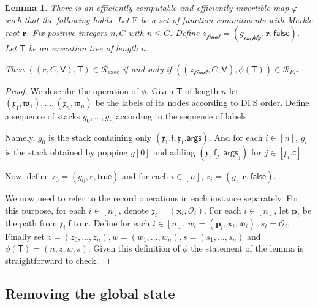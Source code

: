 \documentclass[11pt]{article} %
\newcommand{\rel}{\ensuremath{\mathcal{R}}\xspace}
\newtheorem{lemma}{Lemma}[section]
\newcommand{\f}{\ensuremath{\mathsf{f}}\xspace}
\newcommand{\zfin}{\ensuremath{z_{\mathscr{final}}}\xspace}
\newcommand{\relexec}{\ensuremath{\rel_{\mathrm{exec}}}\xspace}
\newcommand{\true}{\ensuremath{\mathsf{true}}\xspace}
\newcommand{\false}{\ensuremath{\mathsf{false}}\xspace}
\newcommand{\ops}{\ensuremath{\mathcal{O}}\xspace}
\newcommand{\instapp}{\ensuremath{\mathfrak{x}}\xspace}
\newcommand{\witapp}{\ensuremath{\mathfrak{w}}\xspace}
\newcommand{\instnoops}{\ensuremath{\mathbf{x}}\xspace}
\renewcommand{\path}{\ensuremath{\mathbf{p}}\xspace}
\renewcommand{\root}{\ensuremath{\mathbf{r}}\xspace}
\renewcommand{\empty}{\ensuremath{g_{\mathscr{empty}}}\xspace}
\newcommand{\funcs}{\ensuremath{\mathrm{F}}\xspace}
\newcommand{\args}{\ensuremath{\mathsf{args}}\xspace}
\newcommand{\callnum}{\ensuremath{\mathsf{c}}\xspace}
\newcommand{\recset}{\ensuremath{\mathsf{V}}\xspace}
\newcommand{\tree}{\ensuremath{\mathsf{T}}\xspace}
\newcommand{\finpred}{\ensuremath{\mathsf{f}}\xspace}
\begin{document}
\begin{lemma}\label{lem:execasRCG}
There is an efficiently computable and efficiently invertible map $\varphi$ such that the following holds.
Let \funcs be a set of function commitments with Merkle root \root. Fix positive integers $n,C$ with $n\leq C$.
Define $\zfin=(\empty,\root,\false)$. Let \tree be an execution tree of length $n$.

Then  $( (\root,C,\recset),\tree)\in \relexec$ if and only if $((\zfin,C,\recset),\phi(\tree))\in \rel_{F,\finpred}$.

 
\end{lemma}
\begin{proof}
We describe the operation of $\phi$.
Given \tree of length $n$ let $(\instapp_1,\witapp_1),\ldots,(\instapp_{n},\witapp_{n})$ be the labels of its nodes according to 
DFS order.
Define a sequence of stacks $g_0,\ldots,g_n$ according to the sequence of labels.

Namely, $g_0$ is the stack containing only $(\instapp_1.\f,\instapp_1.\args)$. And for each $i\in [n]$, $g_i$ is
the stack obtained by popping $g[0]$ and adding $(\instapp_i.\f_j,\args_j)$ for $j\in [\instapp_i.\callnum]$.

Now, define $z_0=(g_0,\root,\true)$ and for each $i\in [n]$, $z_i=(g_i,\root,\false)$.



We now need to refer to the record operations in each instance separately.
For this purpose,
for each $i\in [n]$, denote $\instapp_i=(\instnoops_i,\ops_i)$.
For each $i\in [n]$, let $\path_i$ be the path from $\instapp_i.\f$ to \root.
Define for each $i\in [n]$, $w_{i}=(\path_i,\instnoops_i,\witapp_i)$, $s_i=\ops_i$.
Finally set $z=(z_0,\ldots,z_n),w=(w_1,\ldots,w_n),s=(s_1,\ldots,s_n)$
 and $\phi(\tree)=(n,z,w,s)$. Given this definition of $\phi$ the statement of the lemma is straightforward to check.
\end{proof}

\subsection{Removing the global state}\label{sec:Fstar}
\end{document}
